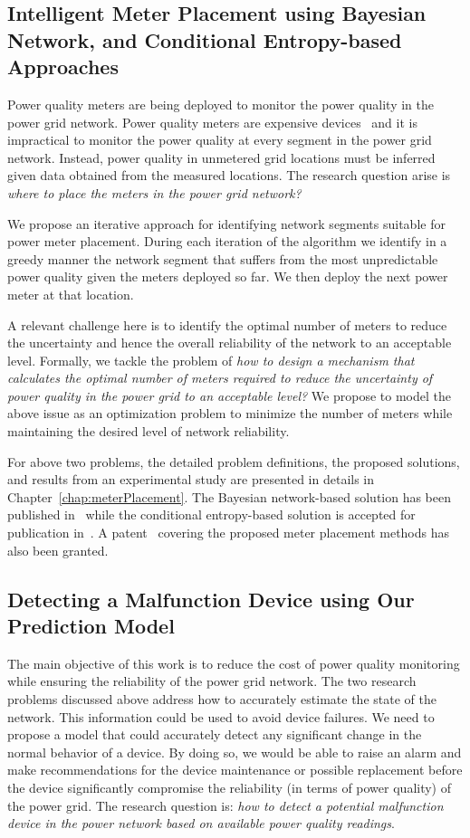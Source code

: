 \subsection{Intelligent Meter Placement using Bayesian Network, and Conditional Entropy-based Approaches}
Power quality meters are being deployed to monitor the power quality in the power grid network. Power quality meters are expensive devices~\cite{fluke_meter, schneider_meter} and it is impractical to monitor the power quality at every segment in the power grid network. Instead, power quality in unmetered grid locations must be inferred given data obtained from the measured locations. The research question arise is \textit{where to place the meters in the power grid network?}
	
We propose an iterative approach for identifying network segments suitable for power meter placement. During each iteration of the algorithm we identify in a greedy manner the network segment that suffers from the most unpredictable power quality given the meters deployed so far. We then deploy the next power meter at that location.

A relevant challenge here is to identify the optimal number of meters to reduce the uncertainty and hence the overall reliability of the network to an acceptable level. Formally, we tackle the problem of \textit{how to design a mechanism that calculates the optimal number of meters required to reduce the uncertainty of power quality in the power grid to an acceptable level?} We propose to model the above issue as an optimization problem to minimize the number of meters while maintaining the desired level of network reliability.

For above two problems, the detailed problem definitions, the proposed solutions, and results from an experimental study are presented in details in Chapter~\ref{chap:meterPlacement}. The Bayesian network-based solution has been published in~\cite{ali2013intelligent} while the conditional entropy-based solution is accepted for publication in~\cite{alimachine}. A patent~\cite{marinakis2014systems} covering the proposed meter placement methods has also been granted.

\subsection{Detecting a Malfunction Device using Our Prediction Model}
The main objective of this work is to reduce the cost of power quality monitoring while ensuring the reliability of the power grid network. The two research problems discussed above address how to accurately estimate the state of the network. This information could be used to avoid device failures. We need to propose a model that could accurately detect any significant change in the normal behavior of a device. By doing so, we would be able to raise an alarm and make recommendations for the device maintenance or possible replacement before the device significantly compromise the reliability (in terms of power quality) of the power grid. The research question is: \textit{how to detect a potential malfunction device in the power network based on available power quality readings}.

